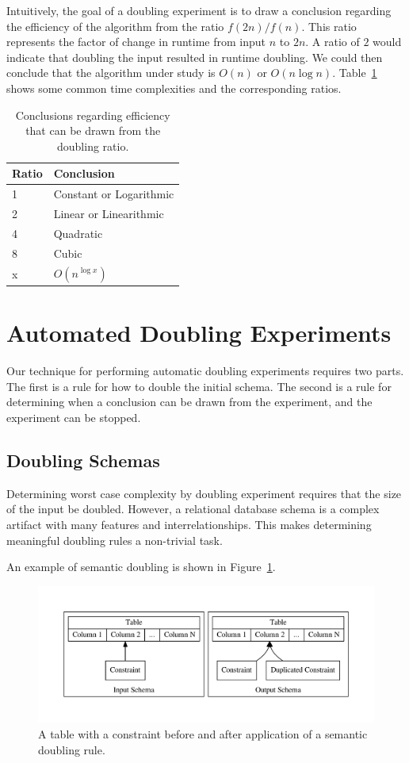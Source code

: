 \documentclass[smallextended]{svjour3}       %
\begin{document}
Intuitively, the goal of a doubling experiment is to draw a conclusion
regarding the efficiency of the algorithm from the ratio
$f(2n)/f(n)$. This ratio represents the factor of change in runtime from
input $n$ to $2n$. A ratio of $2$ would indicate that doubling the
input resulted in runtime doubling. We could then conclude that the
algorithm under study is $O(n)$ or $O(n\log n)$.
Table~\ref{table:ratios} shows some common time complexities and the
corresponding ratios.

\begin{table}[h]
\begin{tabular}{l|l}
Ratio & Conclusion              \\ \hline
1     & Constant or Logarithmic \\
2     & Linear or Linearithmic  \\
4     & Quadratic               \\
8     & Cubic                   \\
x     & $O(n^{\log x})$          
\end{tabular}
\label{table:ratios}
\caption{Conclusions regarding efficiency that can be drawn from the
doubling ratio.}
\end{table}

\section{Automated Doubling Experiments}

  Our technique for performing automatic doubling experiments requires
  two parts.  The first is a rule for how to double the initial schema.
  The second is a rule for determining when a conclusion can be drawn
  from the experiment, and the experiment can be stopped. 

  \subsection{Doubling Schemas}

  Determining worst case complexity by doubling experiment requires that
  the size of the input be doubled.  However, a relational database
  schema is a complex artifact with many features and
  interrelationships. This makes determining meaningful doubling rules a 
  non-trivial task.

  An example of semantic doubling is shown in
  Figure~\ref{fig:semanticconstraint}.


\begin{figure}
\centering
  \centering
  \includegraphics[width=.5\linewidth]{../diagrams/semanticconstraint.pdf}
  \caption{A table with a constraint before and after application of a semantic
  doubling rule.}
  \label{fig:semanticconstraint}
\end{figure}
\end{document}
